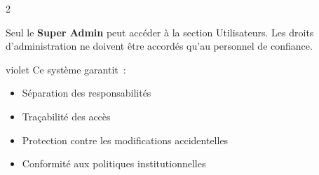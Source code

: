 \begin{multicols}{2}
\begin{dangerbox}
\scriptsize Seul le \textbf{Super Admin} peut acc\'eder \`a la section Utilisateurs. Les droits d'administration ne doivent \^etre accord\'es qu'au personnel de confiance.
\end{dangerbox}

\begin{cbox}[title={\faGavel\ Gouvernance des acc\`es}]{violet}
\scriptsize Ce syst\`eme garantit~:
\begin{itemize}[font=\scriptsize,itemsep=0pt,leftmargin=8pt]
  \item S\'eparation des responsabilit\'es
  \item Tra\c{c}abilit\'e des acc\`es
  \item Protection contre les modifications accidentelles
  \item Conformit\'e aux politiques institutionnelles
\end{itemize}
\end{cbox}

\end{multicols}
